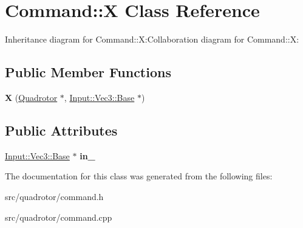 \hypertarget{classCommand_1_1X}{
\section{Command::X Class Reference}
\label{classCommand_1_1X}
}
Inheritance diagram for Command::X:Collaboration diagram for Command::X:\subsection*{Public Member Functions}
\begin{DoxyCompactItemize}
\item 
\hypertarget{classCommand_1_1X_a60d599b8edc5db9fc73e8e6239a7bbf9}{
{\bfseries X} (\hyperlink{classQuadrotor}{Quadrotor} $\ast$, \hyperlink{classInput_1_1Vec3_1_1Base}{Input::Vec3::Base} $\ast$)}
\label{classCommand_1_1X_a60d599b8edc5db9fc73e8e6239a7bbf9}

\end{DoxyCompactItemize}
\subsection*{Public Attributes}
\begin{DoxyCompactItemize}
\item 
\hypertarget{classCommand_1_1X_a238b01c438610d3523c8276a5635cdc2}{
\hyperlink{classInput_1_1Vec3_1_1Base}{Input::Vec3::Base} $\ast$ {\bfseries in\_\-}}
\label{classCommand_1_1X_a238b01c438610d3523c8276a5635cdc2}

\end{DoxyCompactItemize}


The documentation for this class was generated from the following files:\begin{DoxyCompactItemize}
\item 
src/quadrotor/command.h\item 
src/quadrotor/command.cpp\end{DoxyCompactItemize}
